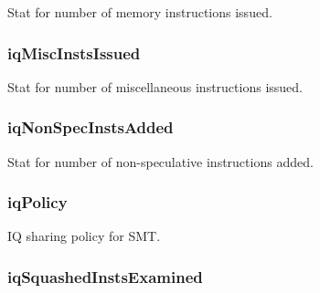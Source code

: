 \label{classInstructionQueue_a5e7d55d3f07e86e389ca3a715766e108}
Stat for number of memory instructions issued. \hypertarget{classInstructionQueue_ad234890bc414fffe7ed71840c51be5cb}{
\subsubsection[{iqMiscInstsIssued}]{ {\bf iqMiscInstsIssued}}}
\label{classInstructionQueue_ad234890bc414fffe7ed71840c51be5cb}
Stat for number of miscellaneous instructions issued. \hypertarget{classInstructionQueue_adf890a08fae50ea8249171b07c40adac}{
\subsubsection[{iqNonSpecInstsAdded}]{ {\bf iqNonSpecInstsAdded}}}
\label{classInstructionQueue_adf890a08fae50ea8249171b07c40adac}
Stat for number of non-\/speculative instructions added. \hypertarget{classInstructionQueue_a558c2854c6103193667179fa6ac0ac20}{
\subsubsection[{iqPolicy}]{ {\bf iqPolicy}}}
\label{classInstructionQueue_a558c2854c6103193667179fa6ac0ac20}
IQ sharing policy for SMT. \hypertarget{classInstructionQueue_a8312e8984bcfab5a77de40e1738103db}{
\subsubsection[{iqSquashedInstsExamined}]{ {\bf iqSquashedInstsExamined}}}
